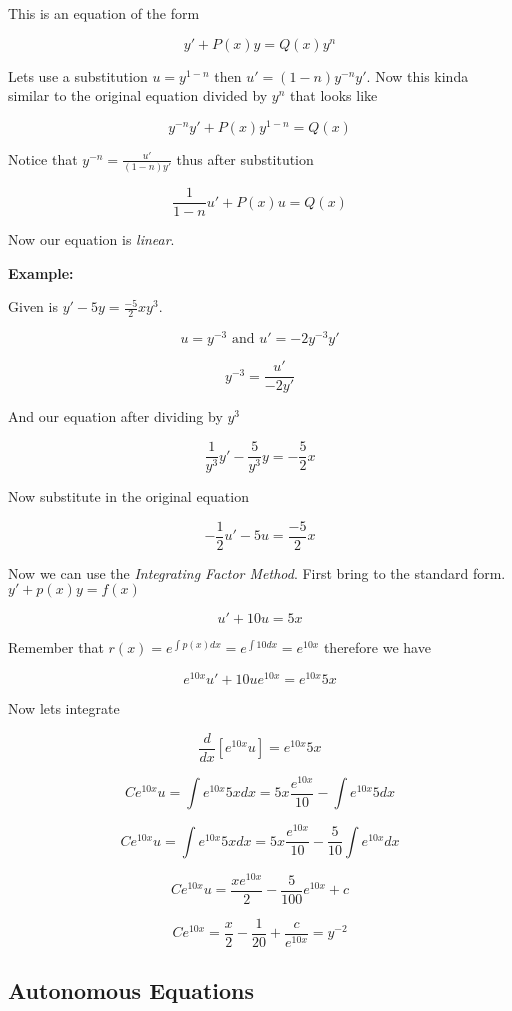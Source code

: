 This is an equation of the form 

\[
y' + P(x)y = Q(x)y^n
\]

Lets use a substitution \(u = y^{1 - n}\) then \(u' = (1 - n)y^{-n} y'\). Now this kinda similar to the original equation
divided by \(y^n\) that looks like

\[
y^{-n}y' + P(x)y^{1 -n} = Q(x)
\]

Notice that \(y^{-n} = \frac{u'}{(1-n)y'}\) thus after substitution

\[
\frac{1}{1 - n}u' + P(x)u = Q(x)
\]

Now our equation is \emph{linear}.
\vspace{\baselineskip}

\textbf{Example: }
\vspace{\baselineskip}

Given is \(y' -5y = \frac{-5}{2}xy^3\).

\[
u = y^{-3}  \text{ and } u' = -2y^{-3}y'
\]

\[
y^{-3} = \frac{u'}{-2y'}
\]

And our equation after dividing by \(y^{3}\)

\[
\frac{1}{y^3}y' - \frac{5}{y^3}y = -\frac{5}{2}x 
\]

Now substitute in the original equation

\[
- \frac{1}{2} u' - 5u = \frac{-5}{2}x
\]

Now we can use the \emph{Integrating Factor Method}. First bring to the standard form.
\(y' + p(x)y = f(x)\)

\[
  u' + 10u = 5x 
\]

Remember that \(r(x) = e^{\int p(x)dx} = e^{\int 10 dx} = e^{10x}\) therefore we have

\[
e^{10x}u' + 10ue^{10x} = e^{10x}5x
\]

Now lets integrate

\[
\frac{d}{dx} \left[e^{10x}u\right] = e^{10x}5x
\]

\[
Ce^{10x}u = \int e^{10x} 5x dx = 5x \frac{e^{10x}}{10} - \int e^{10x}5dx
\]

\[
Ce^{10x}u = \int e^{10x} 5x dx = 5x \frac{e^{10x}}{10} - \frac{5}{10}\int e^{10x}dx
\]

\[
Ce^{10x}u = \frac{xe^{10x}}{2} - \frac{5}{100} e^{10x} + c
\]

\[
    Ce^{10x} = \frac{x}{2} - \frac{1}{20} + \frac{c}{e^{10x}} = y^{-2}
\]


\subsection{Autonomous Equations}

